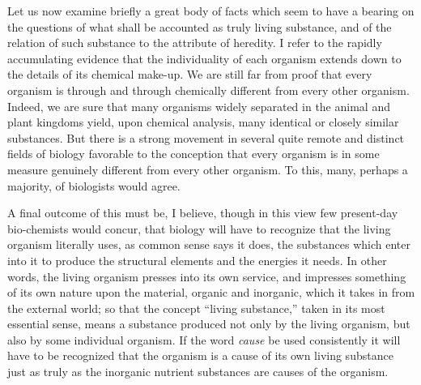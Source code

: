 \documentclass[a4paper, 11pt, oneside, polutonikogreek, english, landscape]{article}
\begin{document}
Let us now examine briefly a great body of facts which seem to have a bearing on the questions of what shall be accounted as truly living substance, and of the relation of such substance to the attribute of heredity. I refer to the rapidly accumulating evidence that the individuality of each organism extends down to the details of its chemical make-up. We are still far from proof that every organism is through and through chemically different from every other organism. Indeed, we are sure that many organisms widely separated in the animal and plant kingdoms yield, upon chemical analysis, many identical or closely similar substances. But there is a strong movement in several quite remote and distinct fields of biology favorable to the conception that every organism is in some measure genuinely different from every other organism. To this, many, perhaps a majority, of biologists would agree.

A final outcome of this must be, I believe, though in this view few present-day bio-chemists would concur, that biology will have to recognize that the living organism literally uses, as common sense says it does, the substances which enter into it to produce the structural elements and the energies it needs. In other words, the living organism presses into its own service, and impresses something of its own nature upon the material, organic and inorganic, which it takes in from the external world; so that the concept ``living substance,'' taken in its most essential sense, means a substance produced not only by the living organism, but also by some individual organism. If the word \emph{cause} be used consistently it will have to be recognized that the organism is a cause of its own living substance just as truly as the inorganic nutrient substances are causes of the organism.
\end{document}
